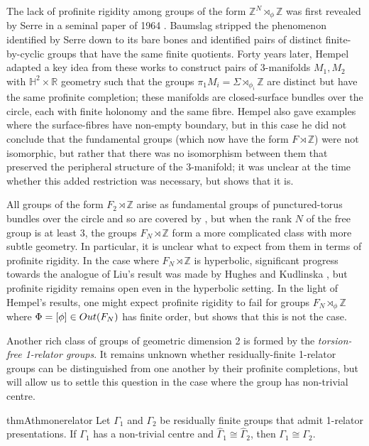 \documentclass[11pt, a4 paper]{amsart}
\numberwithin{equation}{section}
\theoremstyle{remark}
\theoremstyle{definition}
\def\Z{\mathbb Z}
\def\R{\mathbb R}
\def\G{\Gamma}
\def\wh{\widehat}
\def\H{\mathbb{H}}
\def\G{\Gamma}
\begin{document}
The lack of profinite rigidity 
among groups of the form $\Z^N\rtimes_\phi\Z$ 
was first revealed by Serre 
in a seminal paper of 1964 \cite{serre1964exemples}. 
Baumslag \cite{baumslag1974residually} stripped the phenomenon 
identified by Serre down to its bare bones 
and identified pairs of distinct 
finite-by-cyclic groups that have the same finite quotients. 
Forty years later, 
Hempel \cite{hempel2014some} adapted a key idea from these works 
to construct pairs of 3-manifolds $M_1, M_2$ 
with $\H^2\times\R$ geometry such that 
the groups $\pi_1M_i = \Sigma\rtimes_{\phi_i}\Z$ are distinct 
but have the same profinite completion; 
these manifolds are closed-surface bundles over the circle, 
each with finite holonomy and the same fibre. 
Hempel also gave examples where 
the surface-fibres have non-empty boundary, 
but in this case he did not conclude that 
the fundamental groups (which now have the form $F\rtimes\Z$) 
were not isomorphic, but rather that 
there was no isomorphism between them 
that preserved the peripheral structure of the 3-manifold; 
it was unclear at the time 
whether this added restriction was necessary, 
but  shows that it is. 
 
All groups of the form $F_2\rtimes\Z$ arise as 
fundamental groups of punctured-torus bundles over the circle 
and so are covered by \cite{bridson2017profinite}, 
but when the rank $N$ of the free group is at least $3$, 
the groups $F_N\rtimes\Z$ form a more complicated class 
with more subtle geometry. 
In particular, it is unclear what to expect from them 
in terms of profinite rigidity. 
In the case where $F_N\rtimes\Z$ is hyperbolic, 
significant progress towards the analogue of Liu's result 
was made by Hughes and Kudlinska \cite{hughes2023profinite}, 
but profinite rigidity remains open 
even in the hyperbolic setting. 
In the light of Hempel's results, one might expect 
profinite rigidity to fail for groups $F_N\rtimes_\phi\Z$ 
where $\Phi = [\phi] \in{\rm{Out}}(F_N)$ has finite order, 
but  shows that this is not the case.

\medskip

Another rich class of groups of geometric dimension 2 
is formed by the {\em torsion-free 1-relator groups}. 
It remains unknown whether 
residually-finite 1-relator groups 
can be distinguished from one another 
by their profinite completions, 
but  will allow us to settle this question 
in the case where the group has non-trivial centre. 

\begin{restatable}{thmA}{thmonerelator}
\label{t:1-relator} 
	Let $\G_1$ and $\G_2$ be residually finite groups 
	that admit 1-relator presentations. 
	If $\G_1$ has a non-trivial centre 
	and $\wh{\G}_1\cong\wh{\G}_2$, then $\G_1\cong\G_2$.
\end{restatable}
\end{document}
